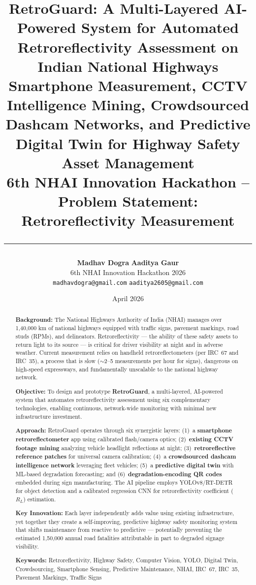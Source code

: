 \documentclass[11pt,a4paper]{article}
\title{
    \vspace{-1cm}
    \textbf{\LARGE RetroGuard: A Multi-Layered AI-Powered System for Automated Retroreflectivity Assessment on Indian National Highways}\\[0.5cm]
    \large Smartphone Measurement, CCTV Intelligence Mining, Crowdsourced Dashcam Networks, and Predictive Digital Twin for Highway Safety Asset Management\\[0.3cm]
    \textbf{6th NHAI Innovation Hackathon -- Problem Statement: Retroreflectivity Measurement}\\[0.5cm]
    \rule{\textwidth}{0.5pt}
}
\author{
    \textbf{Madhav Dogra} \quad \textbf{Aaditya Gaur}\\
    6th NHAI Innovation Hackathon 2026\\
    \texttt{madhavdogra@gmail.com} \quad \texttt{aaditya2605@gmail.com}
}
\date{April 2026}
\begin{document}
\maketitle
\thispagestyle{empty}

\begin{abstract}
\noindent\textbf{Background:} The National Highways Authority of India (NHAI) manages over 1,40,000 km of national highways equipped with traffic signs, pavement markings, road studs (RPMs), and delineators. Retroreflectivity --- the ability of these safety assets to return light to its source --- is critical for driver visibility at night and in adverse weather. Current measurement relies on handheld retroreflectometers (per IRC~67 and IRC~35), a process that is slow ($\sim$2--5 measurements per hour for signs), dangerous on high-speed expressways, and fundamentally unscalable to the national highway network.

\noindent\textbf{Objective:} To design and prototype \textbf{RetroGuard}, a multi-layered, AI-powered system that automates retroreflectivity assessment using six complementary technologies, enabling continuous, network-wide monitoring with minimal new infrastructure investment.

\noindent\textbf{Approach:} RetroGuard operates through six synergistic layers: (1)~a \textbf{smartphone retroreflectometer} app using calibrated flash/camera optics; (2)~\textbf{existing CCTV footage mining} analyzing vehicle headlight reflections at night; (3)~\textbf{retroreflective reference patches} for universal camera calibration; (4)~a \textbf{crowdsourced dashcam intelligence network} leveraging fleet vehicles; (5)~a \textbf{predictive digital twin} with ML-based degradation forecasting; and (6)~\textbf{degradation-encoding QR codes} embedded during sign manufacturing. The AI pipeline employs YOLOv8/RT-DETR for object detection and a calibrated regression CNN for retroreflectivity coefficient ($R_L$) estimation.

\noindent\textbf{Key Innovation:} Each layer independently adds value using existing infrastructure, yet together they create a self-improving, predictive highway safety monitoring system that shifts maintenance from reactive to predictive --- potentially preventing the estimated 1,50,000 annual road fatalities attributable in part to degraded signage visibility.

\vspace{0.3cm}
\noindent\textbf{Keywords:} Retroreflectivity, Highway Safety, Computer Vision, YOLO, Digital Twin, Crowdsourcing, Smartphone Sensing, Predictive Maintenance, NHAI, IRC~67, IRC~35, Pavement Markings, Traffic Signs
\end{abstract}
\end{document}
